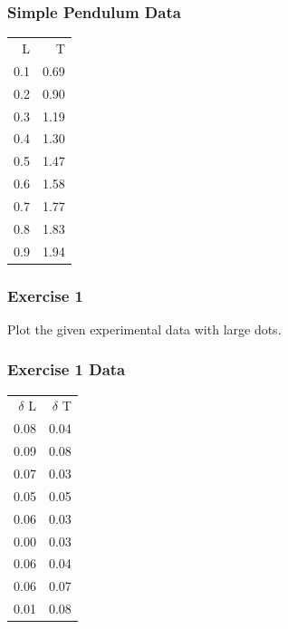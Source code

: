 \documentclass[17pt]{beamer}
\begin{document}
\begin{frame}
\frametitle{Simple Pendulum Data}
\label{sec-3}

\begin{center}
\begin{small}
\begin{tabular}{rr}
   L  &     T  \\
 0.1  &  0.69  \\
 0.2  &  0.90  \\
 0.3  &  1.19  \\
 0.4  &  1.30  \\
 0.5  &  1.47  \\
 0.6  &  1.58  \\
 0.7  &  1.77  \\
 0.8  &  1.83  \\
 0.9  &  1.94  \\
\end{tabular}
\end{small}
\end{center}  
\end{frame}
\begin{frame}
\frametitle{Exercise 1}
\label{sec-4}

  Plot the given experimental data with large dots.
\end{frame}
\begin{frame}
\frametitle{Exercise 1 Data}
\label{sec-5}

\begin{center}
\begin{small}
\begin{tabular}{rr}
 $\delta$ L  &  $\delta$ T  \\
       0.08  &        0.04  \\
       0.09  &        0.08  \\
       0.07  &        0.03  \\
       0.05  &        0.05  \\
       0.06  &        0.03  \\
       0.00  &        0.03  \\
       0.06  &        0.04  \\
       0.06  &        0.07  \\
       0.01  &        0.08  \\
\end{tabular}
\end{small}
\end{center}   
\end{frame}
\end{document}
